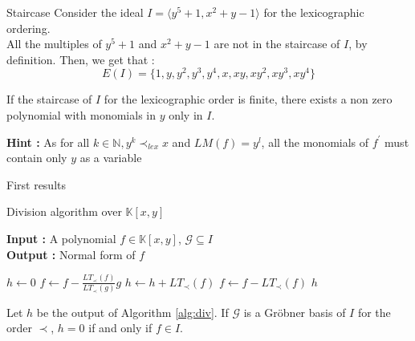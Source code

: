 \documentclass{beamer}
\begin{document}
\begin{frame}{Staircase}
    Consider the ideal $I = \langle y^{5} + 1, x^2 + y - 1 \rangle$ for the lexicographic ordering. \\
    All the multiples of $y^{5} + 1$ and $x^2 + y - 1$ are not in the staircase of $I$, by definition. 
    Then, we get that : 
    \begin{displaymath}
        E(I) = \{ 1, y, y^{2}, y^{3}, y^{4}, x, xy, xy^{2}, xy^{3}, xy^{4} \}
    \end{displaymath}
    \begin{theorem} \label{th:polynomial-only-in-y}
        If the staircase of $I$ for the lexicographic order is finite, there exists a non zero polynomial with monomials in $y$ only in $I$.
    \end{theorem}

    \textbf{Hint :} As for all $k \in \mathbb{N}, y^{k} \prec_{lex} x$ and $LM(f) = y^{l}$, all the monomials of $f^{\prime}$ must contain only $y$ as a variable
\end{frame}

\begin{frame}[shrink=20]{First results}
    \begin{algorithm}[H]
        \caption{Division algorithm over $\mathbb{K}[x, y]$} \label{alg:div}
        \textbf{Input : }A polynomial $f \in \mathbb{K}[x, y]$, $\mathscr{G} \subseteq I$ \\
        \textbf{Output : }Normal form of $f$
        \begin{algorithmic}
            \State $h \gets 0$
                    \State $f \gets f- \displaystyle \frac{LT_{\prec}(f)}{LT_{\prec}(g)}g$
                \Else
                    \State $h \gets h + LT_{\prec}(f)$
                    \State $f \gets f - LT_{\prec}(f)$
                \EndIf
            \EndWhile
            \State \Return $h$
        \end{algorithmic}
        \end{algorithm}
    \begin{theorem} \label{th:ideal-membership-test}
        Let $h$ be the output of Algorithm \ref{alg:div}. If $\mathscr{G}$ is a Gröbner basis of $I$ for the order $\prec$, $h = 0$ if and only if $f \in I$.
    \end{theorem}
\end{frame}
\end{document}

